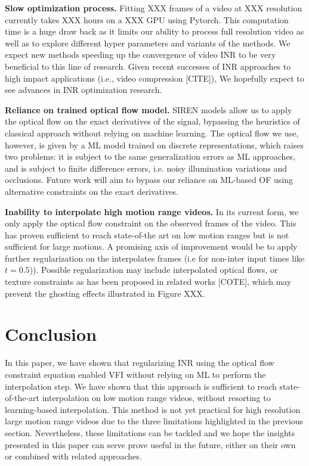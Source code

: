 \documentclass{article}
\begin{document}
\textbf{Slow optimization process.} Fitting XXX frames of a video at XXX resolution currently takes XXX hours on a XXX GPU using Pytorch.
This computation time is a huge draw back as it limits our ability to process full resolution video as well as
to explore different hyper parameters and variants of the methods.
We expect new methods speeding up the convergence of video INR to be very beneficial to this line of research.
Given recent successes of INR approaches to high impact applications (i.e., video compression [CITE]),
We hopefully expect to see advances in INR optimization research.

\textbf{Reliance on trained optical flow model.}
SIREN models allow us to apply the optical flow on the exact derivatives of the signal,
bypassing the heuristics of classical approach without relying on machine learning.
The optical flow we use, however, is given by a ML model trained on discrete representations, which raises two problems:
it is subject to the same generalization errors as ML approaches,
and is subject to finite difference errors, i.e. noisy illumination variations and occlusions.
Future work will aim to bypass our reliance on ML-based OF using alternative constraints on the exact derivatives.

\textbf{Inability to interpolate high motion range videos.}
In its current form, we only apply the optical flow constraint on the observed frames of the video.
This has proven sufficient to reach state-of-the art on low motion ranges but is not sufficient for large motions.
A promising axis of improvement would be to apply further regularization on the interpolates frames (i.e for non-inter input times like $t=0.5$)).
Possible regularization may include interpolated optical flows, or texture constraints as has been proposed in related works [COTE],
which may prevent the ghosting effects illustrated in Figure XXX.

\section{Conclusion}

In this paper, we have shown that regularizing INR using the optical flow constraint equation
enabled VFI without relying on ML to perform the interpolation step.
We have shown that this approach is sufficient to reach state-of-the-art interpolation on low motion range videos,
without resorting to learning-based interpolation.
This method is not yet practical for high resolution large motion range videos due to the three limitations highlighted in the
previous section.
Nevertheless, these limitations can be tackled and we hope the insights presented in this paper can serve prove useful in the future,
either on their own or combined with related approaches.

  
  
\end{document}
